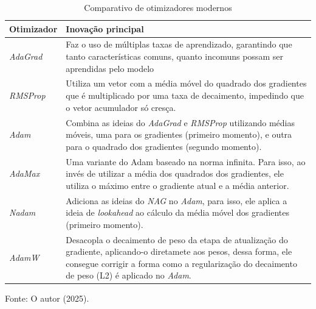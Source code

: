 \begin{table}[htbp]
    \centering
    \begin{threeparttable}
        \caption{Comparativo de otimizadores modernos}
        \label{tab:comparativo-otimizadores-modernos}
        \begin{tabularx}{\textwidth}{p{3.2cm} *{1}{>{\raggedright\arraybackslash}X}}
            \toprule
            \textbf{Otimizador} & \textbf{Inovação principal} \\
            \midrule
            \textit{AdaGrad} & Faz o uso de múltiplas taxas de aprendizado, garantindo que tanto características comuns, quanto incomuns possam ser aprendidas pelo modelo \\
            \addlinespace
            \textit{RMSProp} & Utiliza um vetor com a média móvel do quadrado dos gradientes que é multiplicado por uma taxa de decaimento, impedindo que o vetor acumulador só cresça. \\
            \addlinespace
            \textit{Adam} & Combina as ideias do \textit{AdaGrad} e \textit{RMSProp} utilizando médias móveis, uma para os gradientes (primeiro momento), e outra para o quadrado dos gradientes (segundo momento). \\
            \addlinespace
            \textit{AdaMax} & Uma variante do Adam baseado na norma infinita. Para isso, ao invés de utilizar a média dos quadrados dos gradientes, ele utiliza o máximo entre o gradiente atual e a média anterior. \\
            \addlinespace
            \textit{Nadam} & Adiciona as ideias do \textit{NAG} no \textit{Adam}, para isso, ele aplica a ideia de \textit{lookahead} ao cálculo da média móvel dos gradientes (primeiro momento). \\
            \textit{AdamW} & Desacopla o decaimento de peso da etapa de atualização do gradiente, aplicando-o diretamete aos pesos, dessa forma, ele consegue corrigir a forma como a regularização do decaimento de peso (L2) é aplicado no \textit{Adam}. \\
            \bottomrule
        \end{tabularx}
        
        \begin{tablenotes}[para]
            \small
            \item[] Fonte: O autor (2025).
        \end{tablenotes}

    \end{threeparttable}
\end{table}

